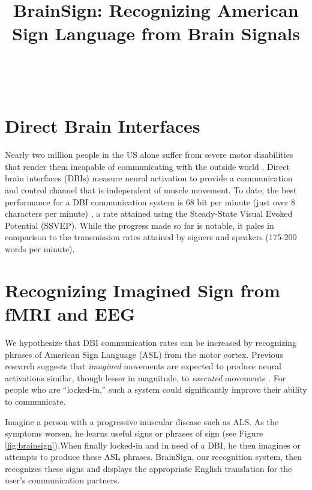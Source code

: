 \documentclass{proposal}
\title{BrainSign:  Recognizing American Sign Language
from Brain Signals}
\begin{document}
\maketitle

\\

\section{Direct Brain Interfaces}

Nearly two million people in the US alone suffer from severe motor disabilities that render them incapable of communicating with the outside world \cite{ficke1992ddp, NABMRR1992, murray1997gmd, carter1997rmn}. Direct brain interfaces (DBIs) measure neural activation to provide a communication and control channel that is independent of muscle movement. To date, the best performance for a DBI communication system is 68 bit per minute (just over 8 characters per minute) \cite{gao2003bbe}, a rate attained using the Steady-State Visual Evoked Potential (SSVEP). While the progress made so far is notable, it pales in comparison to the transmission rates attained by signers and speakers (175-200 words per minute).

\section{Recognizing Imagined Sign from fMRI and EEG}

We hypothesize that DBI communication rates can be increased by recognizing phrases of American Sign Language (ASL) from the motor cortex.  Previous research suggests that \textit{imagined} movements are expected to produce neural activations similar, though lesser in magnitude, to \textit{executed} movements \cite{beisteiner1995mrm,pfurtscheller1997mia, lang1996eam,lotze1999aac}. For people who are ``locked-in,'' such a system could significantly improve their ability to communicate.

Imagine a person with a progressive muscular disease such as ALS.  As the symptoms worsen, he learns useful signs or phrases of sign (see Figure \ref{fig:brainsign}).When finally locked-in and in need of a DBI, he then imagines or attempts to produce these ASL phrases. BrainSign, our recognition system, then recognizes these signs and displays the appropriate English translation for the user's communication partners.

\end{document}
